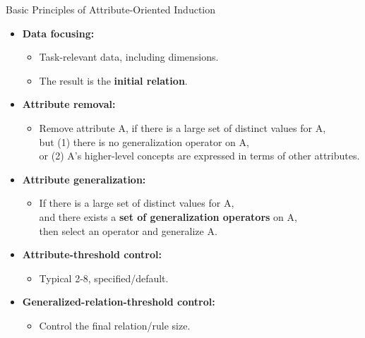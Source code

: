 \begin{frame}{Basic Principles of Attribute-Oriented Induction}
	\begin{itemize}
		\item \textbf{Data focusing:}
		      \begin{itemize}
			      \item Task-relevant data, including dimensions.
			      \item The result is the \textbf{\color{airforceblue}initial relation}.
		      \end{itemize}
		\item \textbf{\color{airforceblue}Attribute removal:}
		      \begin{itemize}
			      \item Remove attribute A, if there is a large set of distinct values for A,\\
			            but (1) there is no generalization operator on A,\\
			            or (2) A's higher-level concepts are expressed in terms of other attributes.
		      \end{itemize}
		\item \textbf{\color{airforceblue}Attribute generalization:}
		      \begin{itemize}
			      \item If there is a large set of distinct values for A,\\
			            and there exists a \textbf{\color{airforceblue}set of generalization operators} on A,\\
			            then select an operator and generalize A.
		      \end{itemize}
		\item \textbf{Attribute-threshold control:}
		      \begin{itemize}
			      \item Typical 2-8, specified/default.
		      \end{itemize}
		\item \textbf{Generalized-relation-threshold control:}
		      \begin{itemize}
			      \item Control the final relation/rule size.
		      \end{itemize}
	\end{itemize}
\end{frame}

